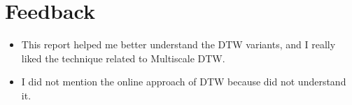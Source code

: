 \documentclass[a4paper, 9pt, twocolumn]{extarticle}
\begin{document}
    \section{Feedback}
    \begin{itemize}
      \item This report helped me better understand the DTW variants, and I really liked the technique related to Multiscale DTW.
      \item I did not mention the online approach of DTW because did not understand it.
    \end{itemize}
\end{document}
